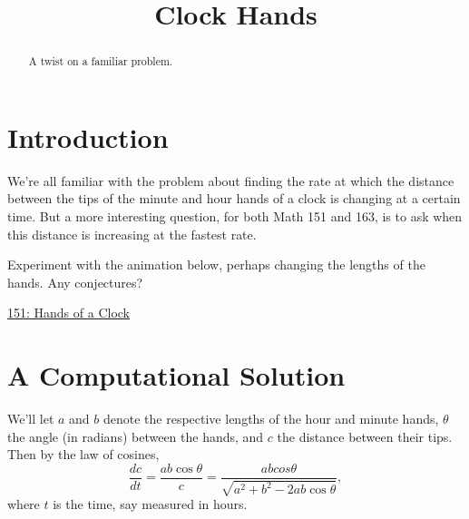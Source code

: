 \documentclass{ximera}
\title{Clock Hands}
\begin{document}
\begin{abstract}
A twist on a familiar problem.
\end{abstract}
\maketitle

\section*{Introduction}
We're all familiar with the problem about finding the rate at which the distance between the tips of the minute and hour hands of a clock is changing at a certain time. But a more interesting question, for both Math 151 and 163, is to ask when this distance is increasing at the fastest rate. 


\begin{exploration}
Experiment with the animation below, perhaps changing the lengths of the hands. Any conjectures?

\begin{onlineOnly}
    \begin{center}
\end{center}
\end{onlineOnly}

\href{https://www.desmos.com/calculator/qvk0mzy26u}{151: Hands of a Clock}


\end{exploration}

\section*{A Computational Solution}

We'll let $a$ and $b$ denote the respective lengths of the hour and minute hands, $\theta$ the angle (in radians) between the hands, and $c$ the distance between their tips. Then by the law of cosines,
\[
        \frac{dc}{dt} = \frac{ab\cos \theta}{c} = \frac{ab cos\theta}{\sqrt{a^2+b^2-2ab\cos\theta}} ,
\]
where $t$ is the time, say measured in hours.
\end{document}
